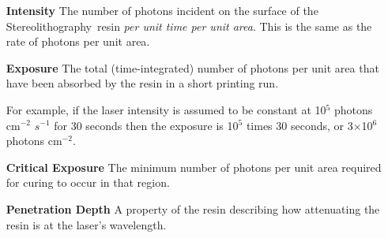 \documentclass[nols,a4paper,twoside,symmetric,justified,marginals=raggedouter]{tufte-book} %
\newcommand{\SL}{Stereolithography}
\begin{document}
\begin{itemize}
	\item[\textbf{Intensity}] The number of photons incident on the surface of the \SL~resin \emph{per unit time per unit area}. This is the same as the rate of photons per unit area. 
	
	\item[\textbf{Exposure}] The total (time-integrated) number of photons per unit area that have been absorbed by the resin in a short printing run. 
			
	For example, if the laser intensity is assumed to be constant at 10$^{5}$ photons cm$^{-2}$ $s^{-1}$ for 30 seconds then the exposure is 10$^{5}$ times 30 seconds, or 3$\times $10$^{6}$ photons cm$^{-2}$.  
	
	\item[\textbf{Critical Exposure}] The minimum number of photons per unit area required for curing to occur in that region. 
	 
	\item[\textbf{Penetration Depth}] A property of the resin describing how attenuating the resin is at the laser's wavelength. 	
	 
\end{itemize}







\printindex %
\end{document}
